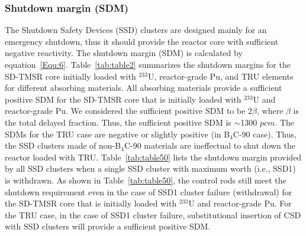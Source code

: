 \subsubsection{Shutdown margin (SDM)}

The Shutdown Safety Devices (SSD) clusters are designed mainly for an emergency shutdown, thus it should 
provide the reactor core with sufficient negative reactivity. The 
shutdown margin (SDM) is calculated by equation~\ref{Equ:6}.
Table~\ref{tab:table2} summarizes the shutdown margins for the SD-TMSR core 
initially loaded with $^{233}$U, reactor-grade Pu, and TRU 
elements for different absorbing materials. All absorbing materials provide a sufficient positive SDM for the SD-TMSR core that is initially loaded with $^{233}$U and reactor-grade Pu. We considered the sufficient positive SDM to be 2$\beta$, where $\beta$ is the total delayed fraction. Thus, the sufficient positive SDM is $\sim$1300 $pcm$. The SDMs for the TRU case are negative or slightly positive (in B$_4$C-90 case). Thus, the SSD clusters made of non-B$_4$C-90 materials are ineffectual to shut down the reactor loaded with TRU. Table~\ref{tab:table50} lists the shutdown margin provided by all SSD clusters when a single SSD cluster with maximum worth (i.e., SSD1) is withdrawn. As shown in Table~\ref{tab:table50}, the control rods still meet the shutdown requirement even in the case of SSD1 cluster failure (withdrawal) for the SD-TMSR core that is initially loaded with $^{233}$U and reactor-grade Pu. For the TRU case, in the case of SSD1 cluster failure, substitutional insertion of CSD with SSD clusters will provide a sufficient positive SDM. 

